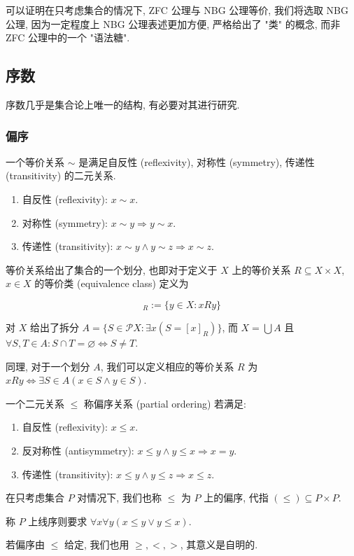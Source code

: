 可以证明在只考虑集合的情况下, ZFC 公理与 NBG 公理等价, 我们将选取 NBG 公理, 因为一定程度上 NBG 公理表述更加方便, 严格给出了 "类" 的概念, 而非 ZFC 公理中的一个 "语法糖".

\subsection{序数}

序数几乎是集合论上唯一的结构, 有必要对其进行研究.

\subsubsection{偏序}

\begin{definition}
    一个等价关系 \(\sim\) 是满足自反性 (reflexivity), 对称性 (symmetry), 传递性 (transitivity) 的二元关系.
    \begin{enumerate}
        \item 自反性 (reflexivity): \(x \sim x\).
        \item 对称性 (symmetry): \(x \sim y \Rightarrow y \sim x\).
        \item 传递性 (transitivity): \(x \sim y \land y \sim z \Rightarrow x \sim z\).
    \end{enumerate}


    等价关系给出了集合的一个划分, 也即对于定义于 \(X\) 上的等价关系 \(R \subseteq X \times X\), \(x \in X\) 的等价类 (equivalence class) 定义为

    \begin{equation}
        [x]_R := \{y \in X : x R y\}
    \end{equation}

    对 \(X\) 给出了拆分 \(A = \{S \in \mathcal{P} X : \exists x (S = [x]_R)\}\),
    而 \(X = \bigcup A\) 且 \(\forall S, T \in A : S \cap T = \varnothing \Leftrightarrow S \neq T\).

    同理, 对于一个划分 \(A\), 我们可以定义相应的等价关系 \(R\) 为 \(x R y \Leftrightarrow \exists S \in A (x \in S \land y \in S)\).
\end{definition}



\begin{definition}
    一个二元关系 \(\le\) 称偏序关系 (partial ordering) 若满足:

    \begin{enumerate}
        \item 自反性 (reflexivity): \(x \le x\).
        \item 反对称性 (antisymmetry): \(x \le y \land y \le x \Rightarrow x = y\).
        \item 传递性 (transitivity): \(x \le y \land y \le z \Rightarrow x \le z\).
    \end{enumerate}

    在只考虑集合 \(P\) 对情况下, 我们也称 \(\le\) 为 \(P\) 上的偏序, 代指 \((\le) \subseteq P \times P\).

    称 \(P\) 上线序则要求 \(\forall x \forall y (x \le y \lor y \le x)\).

    若偏序由 \(\le\) 给定, 我们也用 \(\ge, <, >\), 其意义是自明的.
\end{definition}

